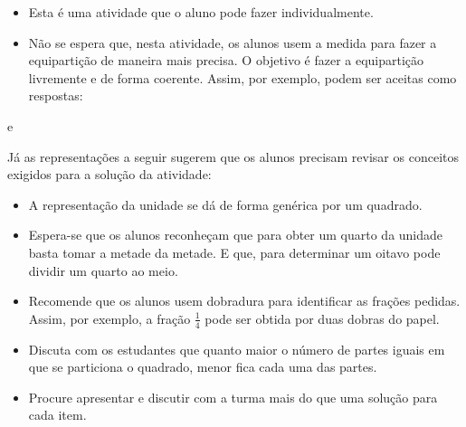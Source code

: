 \begin{multicols}{2}
  \begin{itemize} %
    \item       Esta é uma atividade que o aluno pode fazer individualmente.
    \item       Não se espera que, nesta atividade, os alunos usem a medida para fazer a equipartição de maneira mais precisa. O objetivo é fazer a equipartição livremente e de forma coerente. Assim, por exemplo, podem ser aceitas como respostas:
\end{itemize} %
\begin{center}
e
\end{center}
  Já as representações a seguir sugerem que os alunos precisam revisar os conceitos exigidos para a solução da atividade:
\begin{center}
\end{center}
\begin{itemize} %
    \item       A representação da unidade se dá de forma genérica por um quadrado.
    \item       Espera-se que os alunos reconheçam que para obter um quarto da unidade basta tomar a metade da metade. E que, para determinar um oitavo pode dividir um quarto ao meio.
    \item       Recomende que os alunos usem dobradura para identificar as frações pedidas. Assim, por exemplo, a fração       $\frac{1}{4}$       pode ser obtida por duas dobras do papel.
    \item       Discuta com os estudantes que quanto maior o número de partes iguais em que se particiona o quadrado, menor fica cada uma das partes.
    \item       Procure apresentar e discutir com a turma mais do que uma solução para cada item.

\end{itemize}
\end{multicols}
